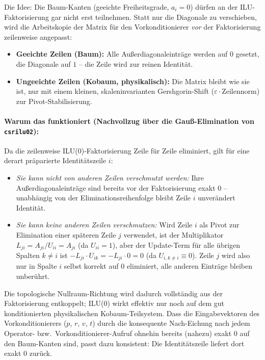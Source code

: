 \documentclass[11pt,a4paper]{article}
\begin{document}
Die Idee: Die Baum-Kanten (geeichte Freiheitsgrade, $a_i = 0$) dürfen an der ILU-Faktorisierung gar nicht erst teilnehmen. Statt nur die Diagonale zu verschieben, wird die Arbeitskopie der Matrix für den Vorkonditionierer \emph{vor} der Faktorisierung zeilenweise angepasst:
\begin{itemize}
    \item \textbf{Geeichte Zeilen (Baum):} Alle Außerdiagonaleinträge werden auf $0$ gesetzt, die Diagonale auf $1$ -- die Zeile wird zur reinen Identität.
    \item \textbf{Ungeeichte Zeilen (Kobaum, physikalisch):} Die Matrix bleibt wie sie ist, nur mit einem kleinen, skaleninvarianten Gershgorin-Shift ($\varepsilon \cdot \text{Zeilennorm}$) zur Pivot-Stabilisierung.
\end{itemize}

\paragraph{Warum das funktioniert (Nachvollzug über die Gauß-Elimination von \texttt{csrilu02}):} Da die zeilenweise ILU(0)-Faktorisierung Zeile für Zeile eliminiert, gilt für eine derart präparierte Identitätszeile $i$:
\begin{itemize}
    \item \emph{Sie kann nicht von anderen Zeilen verschmutzt werden:} Ihre Außerdiagonaleinträge sind bereits vor der Faktorisierung exakt $0$ -- unabhängig von der Eliminationsreihenfolge bleibt Zeile $i$ unverändert Identität.
    \item \emph{Sie kann keine anderen Zeilen verschmutzen:} Wird Zeile $i$ als Pivot zur Elimination einer späteren Zeile $j$ verwendet, ist der Multiplikator $L_{ji} = A_{ji}/U_{ii} = A_{ji}$ (da $U_{ii}=1$), aber der Update-Term für alle übrigen Spalten $k \neq i$ ist $-L_{ji} \cdot U_{ik} = -L_{ji}\cdot 0 = 0$ (da $U_{i,k\neq i} \equiv 0$). Zeile $j$ wird also nur in Spalte $i$ selbst korrekt auf $0$ eliminiert, alle anderen Einträge bleiben unberührt.
\end{itemize}
Die topologische Nullraum-Richtung wird dadurch vollständig aus der Faktorisierung entkoppelt; ILU(0) wirkt effektiv nur noch auf dem gut konditionierten physikalischen Kobaum-Teilsystem. Dass die Eingabevektoren des Vorkonditionierers ($p$, $r$, $v$, $t$) durch die konsequente Nach-Eichung nach jedem Operator- bzw.\ Vorkonditionierer-Aufruf ohnehin bereits (nahezu) exakt $0$ auf den Baum-Kanten sind, passt dazu konsistent: Die Identitätszeile liefert dort exakt $0$ zurück.
\end{document}

